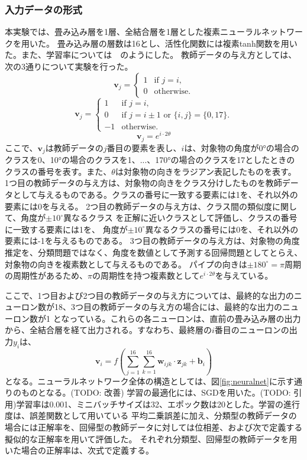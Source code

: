 \documentclass[11pt,a4paper,uplatex]{ujarticle}
\begin{document}
  
  \subsubsection{入力データの形式}
  本実験では、畳み込み層を1層、全結合層を1層とした複素ニューラルネットワークを用いた。
  畳み込み層の層数は16とし、活性化関数には複素tanh関数を用いた。また、学習率については　のようにした。
  教師データの与え方としては、次の3通りについて実験を行った。
  \[
    \mathbf{v}_j =
    \begin{cases}
        1 & \text{if } j = i, \\
        0 & \text{otherwise}.
    \end{cases}
  \]
  \[
    \mathbf{v}_j =
    \begin{cases}
        1 & \text{if } j = i, \\
        0 & \text{if } j = i \pm 1 \text{ or } \{i, j\} = \{0, 17\}.\\
        -1 & \text{otherwise}.
    \end{cases}
  \]
  \[
    \mathbf{v}_j = e^{i\cdot2\theta}
  \]
  ここで、$\mathbf{v}_j$は教師データの$j$番目の要素を表し、$i$は、対象物の角度が0°の場合のクラスを0、10°の場合のクラスを1、...、170°の場合のクラスを17としたときの
  クラスの番号を表す。また、$\theta$は対象物の向きをラジアン表記したものを表す。
  1つ目の教師データの与え方は、対象物の向きをクラス分けしたものを教師データとして与えるものである。クラスの番号に一致する要素には1を、それ以外の要素には0を与える。
  2つ目の教師データの与え方は、クラス間の類似度に関して、角度が$\pm10^{\circ}$異なるクラス
  を正解に近いクラスとして評価し、クラスの番号に一致する要素には1を、 角度が$\pm10^{\circ}$異なるクラスの番号には0を、それ以外の要素には-1を与えるものである。
  3つ目の教師データの与え方は、対象物の角度推定を、分類問題ではなく、角度を数値として予測する回帰問題としてとらえ、対象物の向きを複素数として与えるものである。
  パイプの向きは$\pm180^{\circ} = \pi$周期の周期性があるため、$\pi$の周期性を持つ複素数として$e^{i\cdot2\theta}$を与えている。

  ここで、1つ目および2つ目の教師データの与え方については、最終的な出力のニューロン数が18、3つ目の教師データの与え方の場合には、最終的な出力のニューロン数が1
  となっている。これらの各ニューロンは、直前の畳み込み層の出力から、全結合層を経て出力される。すなわち、最終層の$i$番目のニューロンの出力$y_i$は、
  \[
    \mathbf{v}_i = f(\sum_{j=1}^{16} \sum_{k=1}^{16} \mathbf{w}_{ijk} \cdot \mathbf{z}_{jk} + \mathbf{b}_i)
  \]
  となる。ニューラルネットワーク全体の構造としては、図\ref{fig:neuralnet}に示す通りのものとなる。(TODO: 改善)
  学習の最適化には、SGDを用いた。(TODO: 引用)学習率は0.001、ミニバッチサイズは32、エポック数は20とした。学習の進行度は、誤差関数として用いている
  平均二乗誤差に加え、分類型の教師データの場合には正解率を、回帰型の教師データに対しては位相差、および次で定義する擬似的な正解率を用いて評価した。
  それぞれ分類型、回帰型の教師データを用いた場合の正解率は、次式で定義する。
\end{document}
